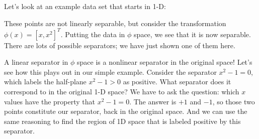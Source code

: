 Let's look at an example data set that starts in 1-D:

\begin{examplebox}
  \begin{center}
  \end{center}
\end{examplebox}

These points are not linearly separable,  but consider the
transformation $\phi(x) = [x,x^2]^T$. Putting the data in $\phi$ space,
we see that it is now separable.  There are lots of possible
separators;  we have just shown one of them here.

\begin{examplebox}
  \begin{center}
  \end{center}
\end{examplebox}

A linear separator in $\phi$ space is a nonlinear separator in the
original space!  Let's see how this plays out in our simple example.
Consider the separator $x^2  - 1 = 0$, which labels the half-plane
$x^2 -1 > 0$ as positive.  What separator does it correspond to in the
original 1-D space?
We have to ask the question:  which $x$ values have the property that
$x^2 - 1 = 0$.  The answer is $+1$ and $-1$, so those two points
constitute our separator, back in the original space.  And we can use
the same reasoning to find the region of 1D space that is labeled
positive by this separator.


